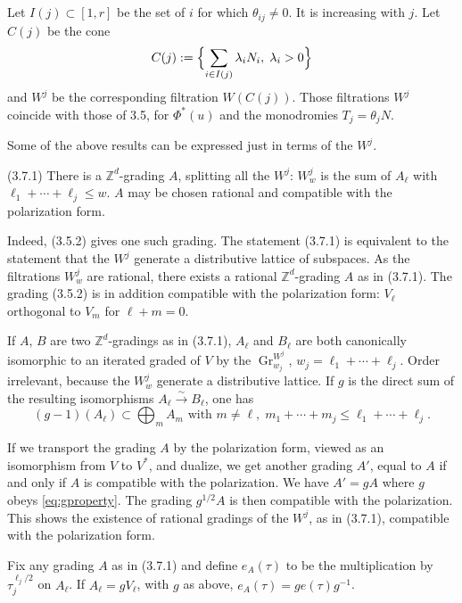 \documentclass[11pt,a4paper]{article}
\theoremstyle{plain}
\theoremstyle{definition}
\DeclareMathOperator{\Gr}{Gr}
\begin{document}
\subsection{}
Let $I(j)\subset[1,r]$ be the set of $i$ for which $\theta_{ij}\neq 0$. It is increasing with $j$. Let $C(j)$ be the cone
\[
C(j):=\Bigl\{\sum_{i\in I(j)}\lambda_i N_i,\; \lambda_i>0\Bigr\}
\]
and $W^j$ be the corresponding filtration $W(C(j))$. Those filtrations $W^j$ coincide with those of 3.5, for $\Phi^*(u)$ and the monodromies $T_j=\theta_j N$.

Some of the above results can be expressed just in terms of the $W^j$.

(3.7.1) There is a $\mathbb{Z}^d$-grading $A$, splitting all the $W^j$: $W^j_w$ is the sum of $A_{\ell}$ with $\ell_1+\cdots+\ell_j\leq w$. $A$ may be chosen rational and compatible with the polarization form.

Indeed, (3.5.2) gives one such grading. The statement (3.7.1) is equivalent to the statement that the $W^j$ generate a distributive lattice of subspaces. As the filtrations $W^j_w$ are rational, there exists a rational $\mathbb{Z}^d$-grading $A$ as in (3.7.1). The grading (3.5.2) is in addition compatible with the polarization form: $V_{\ell}$ orthogonal to $V_m$ for $\ell+m=0$.

If $A$, $B$ are two $\mathbb{Z}^d$-gradings as in (3.7.1), $A_{\ell}$ and $B_{\ell}$ are both canonically isomorphic to an iterated graded of $V$ by the $\Gr^{W^j}_{w_j}$, $w_j=\ell_1+\cdots+\ell_j$. Order irrelevant, because the $W^j_w$ generate a distributive lattice. If $g$ is the direct sum of the resulting isomorphisms $A_{\ell}\xrightarrow{\sim}B_{\ell}$, one has
\begin{equation}\label{eq:gproperty}
(g-1)(A_{\ell})\subset\bigoplus_m A_m\text{ with }m\neq\ell,\; m_1+\cdots+m_j\leq\ell_1+\cdots+\ell_j.
\end{equation}

If we transport the grading $A$ by the polarization form, viewed as an isomorphism from $V$ to $V^*$, and dualize, we get another grading $A'$, equal to $A$ if and only if $A$ is compatible with the polarization. We have $A'=gA$ where $g$ obeys \eqref{eq:gproperty}. The grading $g^{1/2}A$ is then compatible with the polarization. This shows the existence of rational gradings of the $W^j$, as in (3.7.1), compatible with the polarization form.

Fix any grading $A$ as in (3.7.1) and define $e_A(\tau)$ to be the multiplication by $\tau_j^{\ell_j/2}$ on $A_{\ell}$. If $A_{\ell}=gV_{\ell}$, with $g$ as above, $e_A(\tau)=ge(\tau)g^{-1}$.
\end{document}
